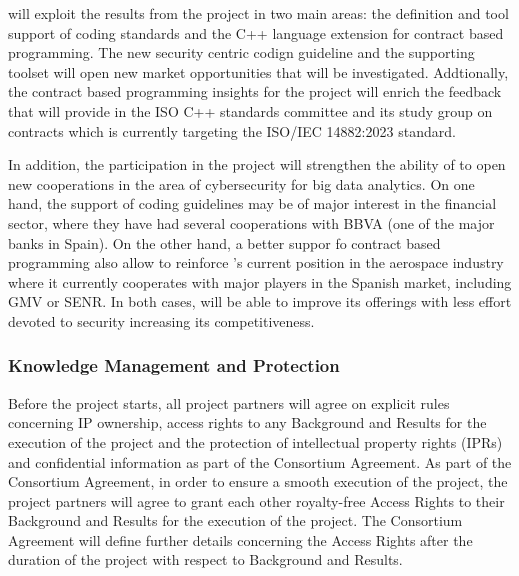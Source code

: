 \documentclass[a4paper,11pt]{article}
\begin{document}
\UCMshort{} will exploit the results from the project in two main areas:
the definition and tool support of coding standards and
the C++ language extension for contract based programming.
The new security centric codign guideline and the supporting toolset will
open new market opportunities that will be investigated.
Addtionally, the contract based programming insights for the project
will enrich the feedback that \UCMshort{} will provide in the 
ISO C++ standards committee and its study group on contracts which
is currently targeting the ISO/IEC 14882:2023 standard.

In addition, the participation in the project will strengthen the ability of
\UCMshort{} to open new cooperations in the area of cybersecurity for big data
analytics. On one hand, the support of coding guidelines may be of major
interest in the financial sector, where they have had several cooperations with
BBVA (one of the major banks in Spain).  On the other hand, a better suppor fo
contract based programming also allow to reinforce \UCMshort's current position
in the aerospace industry where it currently cooperates with major players in
the Spanish market, including GMV or SENR. In both cases, \UCMshort{} will be
able to improve its offerings with less effort devoted to security increasing
its competitiveness.





\subsubsection{Knowledge Management and Protection}
\vspace{-12pt}


Before the project starts, all project partners will agree on explicit rules concerning IP ownership, access rights to any
Background and Results for the execution of the project and the
protection of intellectual property rights (IPRs) and confidential
information as part of the Consortium Agreement.
As part of the Consortium Agreement, in order to ensure a smooth
execution of the project, the project partners will agree to grant each other
royalty-free Access Rights to their Background and Results for the
execution of the project. The Consortium Agreement will define further
details concerning the Access Rights after the duration of the project 
with respect to Background and Results.
\end{document}
